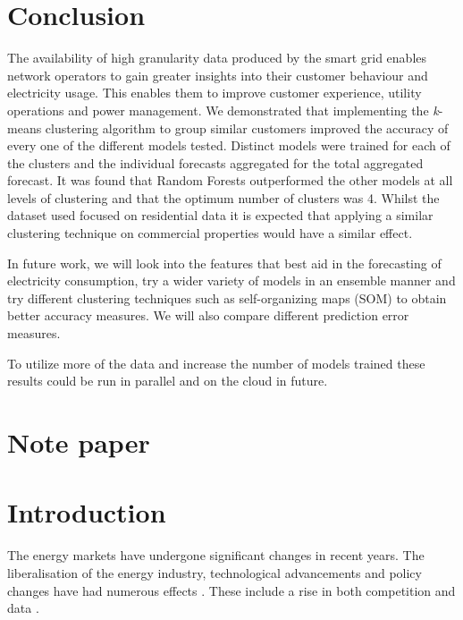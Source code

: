 \section{Conclusion}

The availability of high granularity data produced by the smart grid enables network operators to gain greater insights into their customer behaviour and electricity usage. This enables them to improve customer experience, utility operations and power management. We demonstrated that implementing the \textit{k}-means clustering algorithm to group similar customers improved the accuracy of every one of the different models tested. Distinct models were trained for each of the clusters and the individual forecasts aggregated for the total aggregated forecast. It was found that Random Forests outperformed  the other models at all levels of clustering and that the optimum number of clusters was 4. Whilst the dataset used focused on residential data it is expected that applying a similar clustering technique on commercial properties would have a similar effect.

In future work, we will look into the features that best aid in the forecasting of electricity consumption, try a wider variety of models in an ensemble manner and try different clustering techniques such as self-organizing maps (SOM) to obtain better accuracy measures. We will also compare different prediction error measures.

To utilize more of the data and increase the number of models trained these results could be run in parallel and on the cloud in future.



\section{Note paper}

\section{Introduction}

The energy markets have undergone significant changes in recent years. The liberalisation of the energy industry, technological advancements and policy changes have had numerous effects \cite{Viegas2016}. These include a rise in both competition and data \cite{sioshansi_2009, Clastres2011}. %

